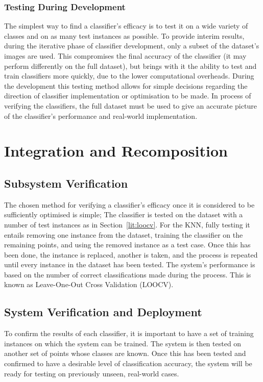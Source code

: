 \subsubsection{Testing During Development}
The simplest way to find a classifier's efficacy is to test it on a wide variety of classes and on as many test instances as possible. To provide interim results, during the iterative phase of classifier development, only a subset of the dataset's images are used. This compromises the final accuracy of the classifier (it may perform differently on the full dataset), but brings with it the ability to test and train classifiers more quickly, due to the lower computational overheads. During the development this testing method allows for simple decisions regarding the direction of classifier implementation or optimisation to be made. In process of verifying the classifiers, the full dataset must be used to give an accurate picture of the classifier's performance and real-world implementation. 

\section{Integration and Recomposition}

\subsection{Subsystem Verification}
The chosen method for verifying a classifier's efficacy once it is considered to be sufficiently optimised is simple; The classifier is tested on the dataset with a number of test instances as in Section~\ref{lit:loocv}. For the KNN, fully testing it entails removing one instance from the dataset, training the classifier on the remaining points, and using the removed instance as a test case. Once this has been done, the instance is replaced, another is taken, and the process is repeated until every instance in the dataset has been tested. The system's performance is based on the number of correct classifications made during the process. This is known as Leave-One-Out Cross Validation (LOOCV).


\subsection{System Verification and Deployment}
To confirm the results of each classifier, it is important to have a set of training instances on which the system can be trained. The system is then tested on another set of points whose classes are known. Once this has been tested and confirmed to have a desirable level of classification accuracy, the system will be ready for testing on previously unseen, real-world cases. 

